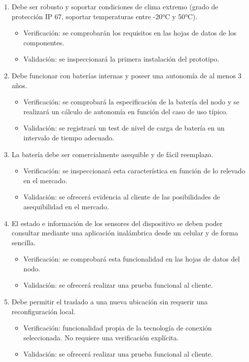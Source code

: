 \documentclass[
11pt, %
]{charter}
\begin{document}
\begin{enumerate}
\begin{enumerate}
			\item Debe ser robusto y soportar condiciones de clima extremo (grado de protección IP 67, soportar temperaturas entre -20°C y 50°C).
			\begin{itemize}
				\item Verificación: se comprobarán los requisitos en las hojas de datos de los componentes.
				\item Validación: se inspeccionará la primera instalación del prototipo.
			\end{itemize}
			\item Debe funcionar con baterías internas y poseer una autonomía de al menos 3 años.
			\begin{itemize}
				\item Verificación: se comprobará la especificación de la batería del nodo y se realizará un cálculo de autonomía en función del caso de uso típico.
				\item Validación: se registrará un test de nivel de carga de batería en un intervalo de tiempo adecuado. 
			\end{itemize}
			\item La batería debe ser comercialmente asequible y de fácil reemplazo.
			\begin{itemize}
				\item Verificación: se inspeccionará esta característica en función de lo relevado en el mercado.
				\item Validación: se ofrecerá evidencia al cliente de las posibilidades de  asequibilidad en el mercado.  
			\end{itemize}
			\item El estado e información de los sensores del dispositivo se deben poder consultar mediante una aplicación inalámbrica desde un celular y de forma sencilla.
			\begin{itemize}
				\item Verificación: se comprobará esta funcionalidad en las hojas de datos del nodo.
				\item Validación: se ofrecerá realizar una prueba funcional al cliente.
			\end{itemize}
			\item Debe permitir el traslado a una nueva ubicación sin requerir una reconfiguración local.
			\begin{itemize}
				\item Verificación: funcionalidad propia de la tecnología de conexión seleccionada. No requiere una verificación explícita.
				\item Validación: se ofrecerá realizar una prueba funcional al cliente.

\end{itemize}
\end{enumerate}
\end{enumerate}
\end{document}
